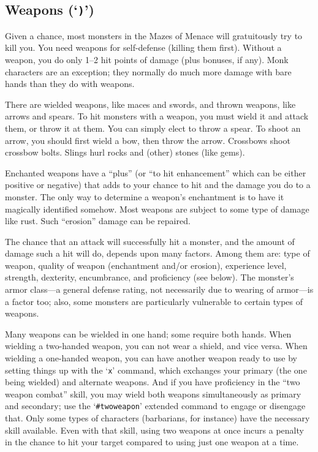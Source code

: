 \subsection*{Weapons (`{\tt )}')}

Given a chance, most monsters in the Mazes of Menace will gratuitously try to
kill you.  You need weapons for self-defense (killing them first).  Without a
weapon, you do only 1--2 hit points of damage (plus bonuses, if any).
Monk characters are an exception; they normally do much more damage with
bare hands than they do with weapons.

There are wielded weapons, like maces and swords, and thrown weapons,
like arrows and spears.  To hit monsters with a weapon, you must wield it and
attack them, or throw it at them.  You can simply elect to throw a spear.
To shoot an arrow, you should first wield a bow, then throw the arrow.
Crossbows shoot crossbow bolts.  Slings hurl rocks and (other) stones
(like gems).

Enchanted weapons have a ``plus'' (or ``to hit enhancement'' which can be
either positive or negative) that adds to your chance to
hit and the damage you do to a monster.  The only way to determine a weapon's
enchantment is to have it magically identified somehow.
Most weapons are subject to some type of damage like rust.  Such
``erosion'' damage can be repaired.

The chance that an attack will successfully hit a monster, and the amount
of damage such a hit will do, depends upon many factors.  Among them are:
type of weapon, quality of weapon (enchantment and/or erosion), experience
level, strength, dexterity, encumbrance, and proficiency (see below).  The
monster's armor class---a general defense rating, not necessarily due to
wearing of armor---is a factor too; also, some monsters are particularly
vulnerable to certain types of weapons.

Many weapons can be wielded in one hand; some require both hands.
When wielding a two-handed weapon, you can not wear a shield, and
vice versa.  When wielding a one-handed weapon, you can have another
weapon ready to use by setting things up with the `{\tt x}' command, which
exchanges your primary (the one being wielded) and alternate weapons.
And if you have proficiency in the ``two weapon combat'' skill, you
may wield both weapons simultaneously as primary and secondary; use the
`{\tt \#twoweapon}' extended command to engage or disengage that.  Only
some types of characters (barbarians, for instance) have the necessary
skill available.  Even with that skill, using two weapons at once incurs
a penalty in the chance to hit your target compared to using just one
weapon at a time.


